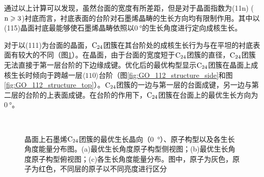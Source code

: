通过以上计算可以发现，虽然台面的宽度有所差距，但是对于晶面指数为(11n) ($\rm{n \geqslant 3}$)衬底而言，衬底表面的台阶对石墨烯晶畴的生长方向均有限制作用。其中以(115)晶面衬底最能够使石墨烯晶畴依照以$\SI{0 }{\degree}$的生长角度进行定向成核生长。

对于以(111)为台面的晶面，$\rm{C_{24}}$团簇在其台阶处的成核生长行为与在平坦的衬底表面有较大的不同（图\ref{fig:GO_C24_112}）。在晶面，由于台面的宽度短于$\rm{C_{24}}$团簇的直径，$\rm{C_{24}}$团簇无法直接于第一层台阶的下边缘成键。优化后的最优构型显示$\rm{C_{24}}$团簇在晶面上成核生长时倾向于跨越一层$\langle 110\rangle$台阶（图\ref{fig:GO_112_structure_side}和图\ref{fig:GO_112_structure_top}）。$\rm{C_{24}}$团簇的一边与第一层的台面成键，另一边与第二层的台阶的上表面成键。在台阶的作用下，$\rm{C_{24}}$团簇在台面上的最优生长方向为$\SI{0}{\degree}$。

\begin{figure}[htb]
    \\
    \caption{晶面上石墨烯$\rm{C_{24}}$团簇的最优生长晶向（\SI{0}  {\degree}）、原子构型以及各生长角度能量分布图。(a)最优生长角度原子构型侧视图；(b)最优生长角度原子构型俯视图；(c)各生长角度能量分布。图中，原子为灰色，原子为红色，不同层的原子以不同亮度进行区分}
    \label{fig:GO_C24_112}
\end{figure}

